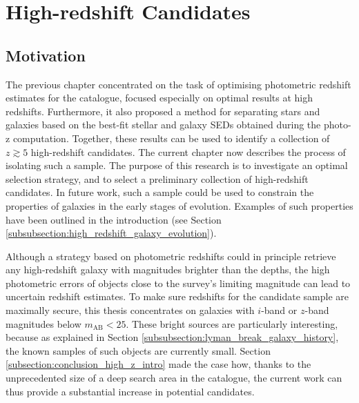\chapter{High-redshift Candidates}\label{chapter:high_redshift_candidates}



\ifpdf
    \graphicspath{{Chapter4/Figs/Raster/}{Chapter4/Figs/PDF/}{Chapter4/Figs/}}
\else
    \graphicspath{{Chapter4/Figs/Vector/}{Chapter4/Figs/}}
\fi




\section{Motivation}\label{section:motivation_high_z}
The previous chapter concentrated on the task of optimising photometric redshift estimates for the \DESVIDEO catalogue, focused especially on optimal results at high redshifts. Furthermore, it also proposed a method for separating stars and galaxies based on the best-fit stellar and galaxy SEDs obtained during the photo-z computation. Together, these results
can be used to identify a collection of $z\gtrsim 5$ high-redshift candidates. The current chapter now describes the process of isolating such a sample. The purpose of this research is to investigate an optimal selection strategy, and to select a preliminary collection of high-redshift candidates. In future work, such a sample could be used to constrain the properties of galaxies in the early stages of evolution. Examples of such properties have been outlined in the introduction (see Section \ref{subsubsection:high_redshift_galaxy_evolution}). \par 

Although a strategy based on photometric redshifts could in principle retrieve any high-redshift galaxy with magnitudes brighter than the \DESVIDEO depths, the high photometric errors of objects close to the survey's limiting magnitude can lead to uncertain redshift estimates. To make sure redshifts for the candidate sample are maximally secure, this thesis concentrates on galaxies with $i$-band or $z$-band magnitudes below $m_{\mathrm{AB}}< 25$. These bright sources are particularly interesting, because as explained in Section \ref{subsubsection:lyman_break_galaxy_history}, the known samples of such objects are currently small. Section \ref{subsection:conclusion_high_z_intro} made the case how, thanks to the unprecedented size of a deep search area in the \DESVIDEO catalogue, the current work can thus provide a substantial increase in potential candidates. \par 

